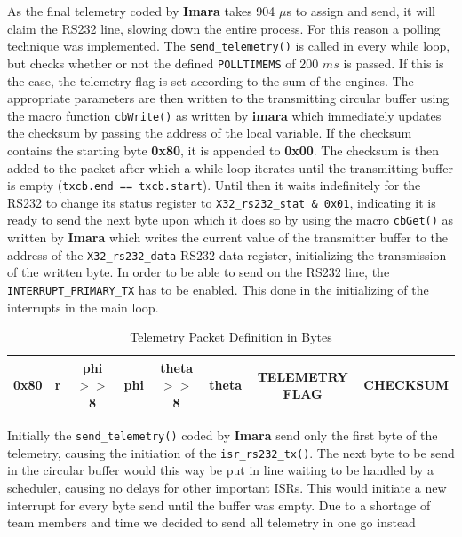 \documentclass{article}
\begin{document}
As the final telemetry coded by \textbf{Imara} takes 904 $\mu$s to assign and send, it will claim the RS232 line, slowing down the entire process. For this reason a polling technique was implemented. The \texttt{send\_telemetry()} is called in every while loop, but checks whether or not the defined \texttt{POLLTIMEMS} of 200 $ms$ is passed. If this is the case, the telemetry flag is set according to the sum of the engines. The appropriate parameters are then written to the transmitting circular buffer using the macro function \texttt{cbWrite()} as written by \textbf{imara} which immediately updates the checksum by passing the address of the local variable. If the checksum contains the starting byte \textbf{0x80}, it is appended to \textbf{0x00}. The checksum is then added to the packet after which a while loop iterates until the transmitting buffer is empty (\texttt{txcb.end == txcb.start}). Until then it waits indefinitely for the RS232 to change its status register to \texttt{X32\_rs232\_stat \& 0x01}, indicating it is ready to send the next byte upon which it does so by using the macro \texttt{cbGet()} as written by \textbf{Imara} which writes the current value of the transmitter buffer to the address of the \texttt{X32\_rs232\_data} RS232 data register, initializing the transmission of the written byte. In order to be able to send on the RS232 line, the \texttt{INTERRUPT\_PRIMARY\_TX} has to be enabled. This done in the initializing of the interrupts in the main loop. 

\begin{table}[ht]
\centering
\begin{tabular}{|c|c|c|c|c|c|c|c|}
\hline 
0x80 & r & phi $>>$ 8 & phi & theta $>>$ 8 & theta & TELEMETRY FLAG & CHECKSUM \\
\hline 
\end{tabular} 
\caption{Telemetry Packet Definition in Bytes}
\label{tbl:TelPkgDefinition}
\end{table}


Initially the \texttt{send\_telemetry()} coded by \textbf{Imara} send only the first byte of the telemetry, causing the initiation of the \texttt{isr\_rs232\_tx()}. The next byte to be send in the circular buffer would this way be put in line waiting to be handled by a scheduler, causing no delays for other important ISRs. This would initiate a new interrupt for every byte send until the buffer was empty. Due to a shortage of team members and time we decided to send all telemetry in one go instead

% 
\end{document}
